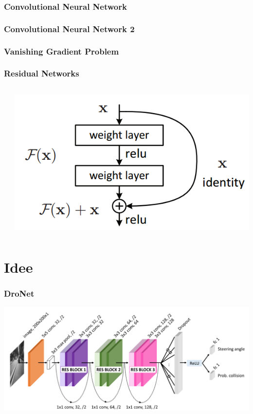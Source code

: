 \documentclass{beamer}
\begin{document}
\begin{frame}
\frametitle{Convolutional Neural Network}

\end{frame}

\begin{frame}
\frametitle{Convolutional Neural Network 2}

\end{frame}

\begin{frame}
\frametitle{Vanishing Gradient Problem}

\end{frame}

\begin{frame}

\frametitle{Residual Networks}

\begin{columns}[T]

\begin{column}[T]{5cm}


\end{column}

\begin{column}[T]{5cm}
	\includegraphics[scale=0.27]{figures/ResidualBlock.png}	 
\end{column}

\end{columns}

\end{frame}

\section{Idee}
\frame{\tableofcontents[currentsection]}

\begin{frame}
\frametitle{DroNet}
\includegraphics[width=\linewidth]{figures/Architecture-DRONET.png}	

\end{frame}
\end{document}
